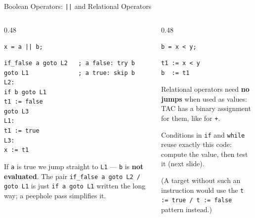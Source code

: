 \documentclass[aspectratio=169,11pt,xcolor=table]{beamer}
\newcommand{\tc}[1]{\texttt{#1}}
\begin{document}
\begin{frame}[fragile]{Boolean Operators: \tc{||} and Relational Operators}
  \begin{columns}[T]
    \begin{column}{0.48\textwidth}
      \begin{block}{\tc{x = a || b;}}
        \begin{verbatim}
if_false a goto L2   ; a false: try b
goto L1              ; a true: skip b
L2:
if b goto L1
t1 := false
goto L3
L1:
t1 := true
L3:
x := t1
        \end{verbatim}
      \end{block}
      \scriptsize
      If \tc{a} is true we jump straight to \tc{L1} — \tc{b} is
      \textbf{not evaluated}. The pair \tc{if\_false a goto L2 / goto L1}
      is just \tc{if a goto L1} written the long way; a peephole pass
      simplifies it.
    \end{column}
    \begin{column}{0.48\textwidth}
      \begin{block}{\tc{b = x < y;}}
        \begin{verbatim}
t1 := x < y
b  := t1
        \end{verbatim}
      \end{block}
      \scriptsize
      Relational operators need \textbf{no jumps} when used as values:
      TAC has a binary assignment for them, like for \tc{+}.

      \medskip
      Conditions in \tc{if} and \tc{while} reuse exactly this code:
      compute the value, then test it (next slide).

      \medskip
      (A target without such an instruction would use the
      \tc{t := true / t := false} pattern instead.)
    \end{column}
  \end{columns}
\end{frame}
\end{document}
